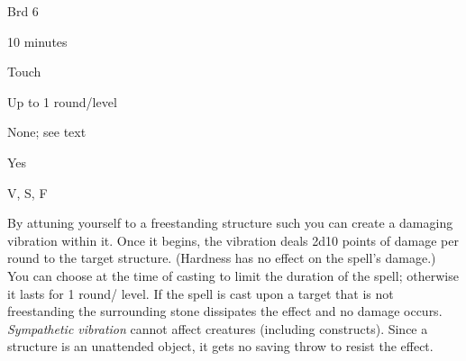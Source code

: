 
\begin{description*}
\item[Level:] Brd 6
\item[Casting Time:] 10 minutes
\item[Range:] Touch
\item[Duration:] Up to 1 round/level
\item[Saving Throw:] None; see text
\item[Spell Resistance:] Yes
\item[Components:] V, S, F
\end{description*}

By attuning yourself to a freestanding structure such you can create a damaging
vibration within it. Once it begins, the vibration deals 2d10 points of damage
per round to the target structure. (Hardness has no effect on the spell's damage.)
You can choose at the time of casting to limit the duration of the spell; otherwise
it lasts for 1 round/ level. If the spell is cast upon a target that is not freestanding
the surrounding stone dissipates the effect and no damage occurs.
\textit{Sympathetic vibration} cannot affect creatures (including constructs).
Since a structure is an unattended object, it gets no saving throw to resist the
effect.